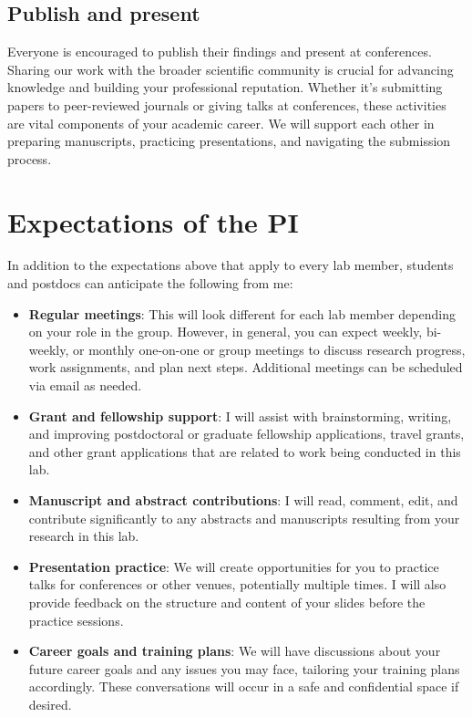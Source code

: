 \documentclass[
  letterpaper,
  DIV=11,
  numbers=noendperiod]{scrreprt}
\providecommand{\tightlist}{%
  \setlength{\itemsep}{0pt}\setlength{\parskip}{0pt}}\usepackage{longtable,booktabs,array}
\begin{document}
\subsection*{Publish and present}\label{publish-and-present}

Everyone is encouraged to publish their findings and present at
conferences. Sharing our work with the broader scientific community is
crucial for advancing knowledge and building your professional
reputation. Whether it's submitting papers to peer-reviewed journals or
giving talks at conferences, these activities are vital components of
your academic career. We will support each other in preparing
manuscripts, practicing presentations, and navigating the submission
process.

\section*{Expectations of the PI}\label{expectations-of-the-pi}


In addition to the expectations above that apply to every lab member,
students and postdocs can anticipate the following from me:

\begin{itemize}
\tightlist
\item
  \textbf{Regular meetings}: This will look different for each lab
  member depending on your role in the group. However, in general, you
  can expect weekly, bi-weekly, or monthly one-on-one or group meetings
  to discuss research progress, work assignments, and plan next steps.
  Additional meetings can be scheduled via email as needed.
\item
  \textbf{Grant and fellowship support}: I will assist with
  brainstorming, writing, and improving postdoctoral or graduate
  fellowship applications, travel grants, and other grant applications
  that are related to work being conducted in this lab.
\item
  \textbf{Manuscript and abstract contributions}: I will read, comment,
  edit, and contribute significantly to any abstracts and manuscripts
  resulting from your research in this lab.
\item
  \textbf{Presentation practice}: We will create opportunities for you
  to practice talks for conferences or other venues, potentially
  multiple times. I will also provide feedback on the structure and
  content of your slides before the practice sessions.
\item
  \textbf{Career goals and training plans}: We will have discussions
  about your future career goals and any issues you may face, tailoring
  your training plans accordingly. These conversations will occur in a
  safe and confidential space if desired.
\end{itemize}
\end{document}
